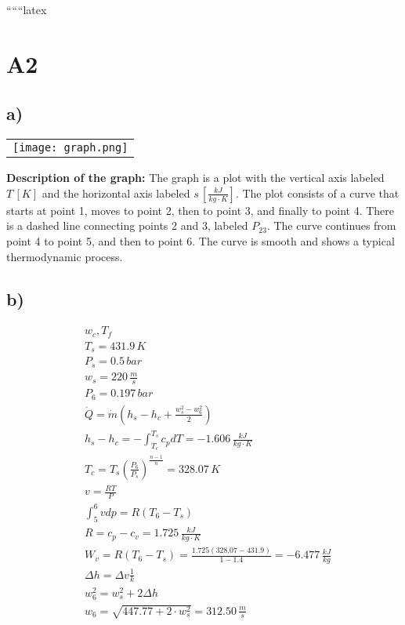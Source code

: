 
``````latex


\section*{A2}

\subsection*{a)}

\begin{center}
\begin{tabular}{c}
\texttt{[image: graph.png]}
\end{tabular}
\end{center}

\textbf{Description of the graph:} The graph is a plot with the vertical axis labeled $T \, [K]$ and the horizontal axis labeled $s \, \left[\frac{kJ}{kg \cdot K}\right]$. The plot consists of a curve that starts at point 1, moves to point 2, then to point 3, and finally to point 4. There is a dashed line connecting points 2 and 3, labeled $P_{23}$. The curve continues from point 4 to point 5, and then to point 6. The curve is smooth and shows a typical thermodynamic process.

\subsection*{b)}

\begin{align*}
& w_c, T_f \\
& T_s = 431.9 \, K \\
& P_s = 0.5 \, bar \\
& w_s = 220 \, \frac{m}{s} \\
& P_6 = 0.197 \, bar \\
& \dot{Q} = \dot{m} \left( h_s - h_c + \frac{w_s^2 - w_6^2}{2} \right) \\
& h_s - h_c = - \int_{T_c}^{T_s} c_p dT = -1.606 \, \frac{kJ}{kg \cdot K} \\
& T_c = T_s \left( \frac{P_6}{P_s} \right)^{\frac{n-1}{n}} = 328.07 \, K \\
& v = \frac{RT}{P} \\
& \int_{5}^{6} v dp = R \left( T_6 - T_s \right) \\
& R = c_p - c_v = 1.725 \, \frac{kJ}{kg \cdot K} \\
& W_v = R \left( T_6 - T_s \right) = \frac{1.725 \left( 328.07 - 431.9 \right)}{1 - 1.4} = -6.477 \, \frac{kJ}{kg} \\
& \Delta h = \Delta v \frac{1}{k} \\
& w_6^2 = w_s^2 + 2 \Delta h \\
& w_6 = \sqrt{447.77 + 2 \cdot w_s^2} = 312.50 \, \frac{m}{s}
\end{align*}

